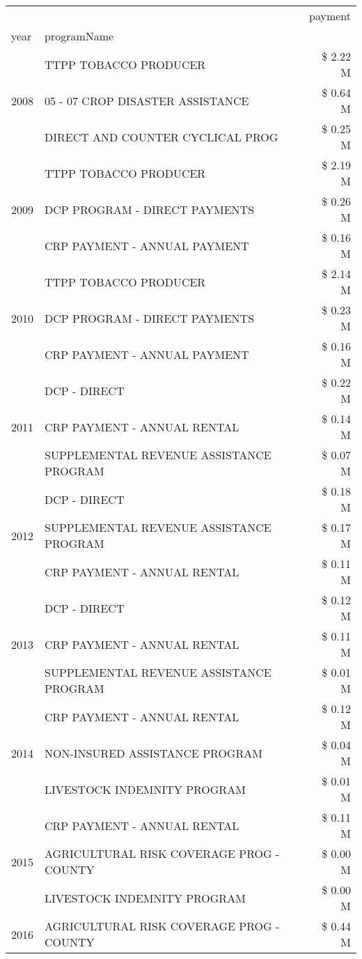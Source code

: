 \begin{tabular}{llr}
\toprule
 &  & payment \\
year & programName &  \\
\midrule
\multirow[t]{3}{*}{2008} & TTPP TOBACCO PRODUCER & \$ 2.22 M \\
 & 05 - 07 CROP DISASTER ASSISTANCE & \$ 0.64 M \\
 & DIRECT AND COUNTER CYCLICAL PROG & \$ 0.25 M \\
\cline{1-3}
\multirow[t]{3}{*}{2009} & TTPP TOBACCO PRODUCER & \$ 2.19 M \\
 & DCP PROGRAM - DIRECT PAYMENTS & \$ 0.26 M \\
 & CRP PAYMENT - ANNUAL PAYMENT & \$ 0.16 M \\
\cline{1-3}
\multirow[t]{3}{*}{2010} & TTPP TOBACCO PRODUCER & \$ 2.14 M \\
 & DCP PROGRAM - DIRECT PAYMENTS & \$ 0.23 M \\
 & CRP PAYMENT - ANNUAL PAYMENT & \$ 0.16 M \\
\cline{1-3}
\multirow[t]{3}{*}{2011} & DCP - DIRECT & \$ 0.22 M \\
 & CRP PAYMENT - ANNUAL RENTAL & \$ 0.14 M \\
 & SUPPLEMENTAL REVENUE ASSISTANCE PROGRAM & \$ 0.07 M \\
\cline{1-3}
\multirow[t]{3}{*}{2012} & DCP - DIRECT & \$ 0.18 M \\
 & SUPPLEMENTAL REVENUE ASSISTANCE PROGRAM & \$ 0.17 M \\
 & CRP PAYMENT - ANNUAL RENTAL & \$ 0.11 M \\
\cline{1-3}
\multirow[t]{3}{*}{2013} & DCP - DIRECT & \$ 0.12 M \\
 & CRP PAYMENT - ANNUAL RENTAL & \$ 0.11 M \\
 & SUPPLEMENTAL REVENUE ASSISTANCE PROGRAM & \$ 0.01 M \\
\cline{1-3}
\multirow[t]{3}{*}{2014} & CRP PAYMENT - ANNUAL RENTAL & \$ 0.12 M \\
 & NON-INSURED ASSISTANCE PROGRAM & \$ 0.04 M \\
 & LIVESTOCK INDEMNITY PROGRAM & \$ 0.01 M \\
\cline{1-3}
\multirow[t]{3}{*}{2015} & CRP PAYMENT - ANNUAL RENTAL & \$ 0.11 M \\
 & AGRICULTURAL RISK COVERAGE PROG - COUNTY & \$ 0.00 M \\
 & LIVESTOCK INDEMNITY PROGRAM & \$ 0.00 M \\
\cline{1-3}
\multirow[t]{3}{*}{2016} & AGRICULTURAL RISK COVERAGE PROG - COUNTY & \$ 0.44 M \\

\end{tabular}
